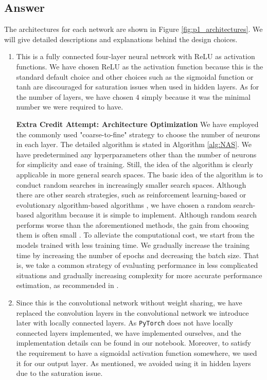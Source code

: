\documentclass[
	12pt, %
]{../Template/fphw}
\begin{document}
\subsection*{Answer}
The architectures for each network are shown in Figure \ref{fig:p1_architectures}. We will give detailed descriptions and explanations behind the design choices.
\begin{enumerate}[label = (\arabic*)] 
	\item This is a fully connected four-layer neural network with ReLU as activation functions.  We have chosen ReLU as the activation function because this is the standard default choice \cite[p188]{Goodfellow-et-al-2016} and other choices such as the sigmoidal function or tanh are discouraged for saturation issues when used in hidden layers\cite[p191]{Goodfellow-et-al-2016}. As for the number of layers, we have chosen $4$ simply because it was the minimal number we were required to have.  
 
    \textbf{Extra Credit Attempt: Architecture Optimization} We have employed the commonly used "coarse-to-fine" strategy to choose the number of neurons in each layer. The detailed algorithm is stated in Algorithm \ref{alg:NAS}. We have predetermined any hyperparameters other than the number of neurons for simplicity and ease of training. Still, the idea of the algorithm is clearly applicable in more general search spaces. The basic idea of the algorithm is to conduct random searches in increasingly smaller search spaces. Although there are other search strategies, such as reinforcement learning-based or evolutionary algorithm-based algorithms \cite[p68]{automl}, we have chosen a random search-based algorithm because it is simple to implement. Although random search performs worse than the aforementioned methods, the gain from choosing them is often small \cite[p69]{automl}. To alleviate the computational cost, we start from the models trained with less training time. We gradually increase the training time by increasing the number of epochs and decreasing the batch size. That is, we take a common strategy of evaluating performance in less complicated situations and gradually increasing complexity for more accurate performance estimation, as recommended in \cite[p71]{automl}.
    
	\item Since this is the convolutional network without weight sharing, we have replaced the convolution layers in the convolutional network we introduce later with locally connected layers. As \verb|PyTorch|\cite{pytorch} does not have locally connected layers implemented, we have implemented ourselves, and the implementation details can be found in our notebook. Moreover, to satisfy the requirement to have a sigmoidal activation function somewhere, we used it for our output layer. As mentioned, we avoided using it in hidden layers due to the saturation issue.


\end{enumerate}
\end{document}
